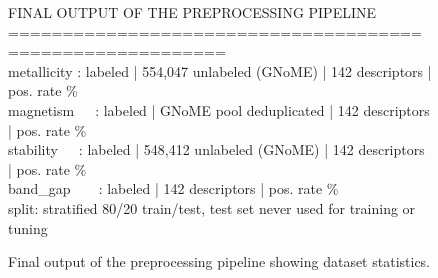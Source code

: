 \begin{enumerate}[leftmargin=*]
\begin{figure}[H]
\begin{console}
FINAL OUTPUT OF THE PREPROCESSING PIPELINE\\
==========================================================\\
metallicity : \MetalN{} labeled | 554,047 unlabeled (GNoME) | 142 descriptors | pos. rate \MetalPos{}\%\\
magnetism~~~: \MagN{} labeled | GNoME pool deduplicated | 142 descriptors | pos. rate \MagPos{}\%\\
stability~~~: \StabN{} labeled | 548,412 unlabeled (GNoME) | 142 descriptors | pos. rate \StabPos{}\%\\
band\_gap~~~~: \GapN{} labeled | 142 descriptors | pos. rate \GapPos{}\%\\
split: stratified 80/20 train/test, test set never used for training or tuning
\end{console}
\caption{Final output of the preprocessing pipeline showing dataset statistics.}
\end{figure}
\end{enumerate}
